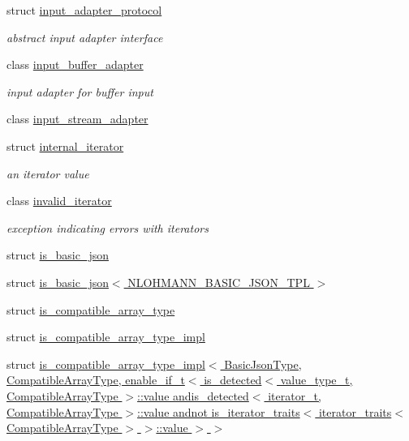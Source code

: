 \begin{DoxyCompactItemize}
struct \hyperlink{structnlohmann_1_1detail_1_1input__adapter__protocol}{input\+\_\+adapter\+\_\+protocol}
\begin{DoxyCompactList}\small\item\em abstract input adapter interface \end{DoxyCompactList}\item 
class \hyperlink{classnlohmann_1_1detail_1_1input__buffer__adapter}{input\+\_\+buffer\+\_\+adapter}
\begin{DoxyCompactList}\small\item\em input adapter for buffer input \end{DoxyCompactList}\item 
class \hyperlink{classnlohmann_1_1detail_1_1input__stream__adapter}{input\+\_\+stream\+\_\+adapter}
\item 
struct \hyperlink{structnlohmann_1_1detail_1_1internal__iterator}{internal\+\_\+iterator}
\begin{DoxyCompactList}\small\item\em an iterator value \end{DoxyCompactList}\item 
class \hyperlink{classnlohmann_1_1detail_1_1invalid__iterator}{invalid\+\_\+iterator}
\begin{DoxyCompactList}\small\item\em exception indicating errors with iterators \end{DoxyCompactList}\item 
struct \hyperlink{structnlohmann_1_1detail_1_1is__basic__json}{is\+\_\+basic\+\_\+json}
\item 
struct \hyperlink{structnlohmann_1_1detail_1_1is__basic__json_3_01_n_l_o_h_m_a_n_n___b_a_s_i_c___j_s_o_n___t_p_l_01_4}{is\+\_\+basic\+\_\+json$<$ N\+L\+O\+H\+M\+A\+N\+N\+\_\+\+B\+A\+S\+I\+C\+\_\+\+J\+S\+O\+N\+\_\+\+T\+P\+L $>$}
\item 
struct \hyperlink{structnlohmann_1_1detail_1_1is__compatible__array__type}{is\+\_\+compatible\+\_\+array\+\_\+type}
\item 
struct \hyperlink{structnlohmann_1_1detail_1_1is__compatible__array__type__impl}{is\+\_\+compatible\+\_\+array\+\_\+type\+\_\+impl}
\item 
struct \hyperlink{structnlohmann_1_1detail_1_1is__compatible__array__type__impl_3_01_basic_json_type_00_01_compatia6522f047ce0d0bd05b38ab6101e8786}{is\+\_\+compatible\+\_\+array\+\_\+type\+\_\+impl$<$ Basic\+Json\+Type, Compatible\+Array\+Type, enable\+\_\+if\+\_\+t$<$ is\+\_\+detected$<$ value\+\_\+type\+\_\+t, Compatible\+Array\+Type $>$\+::value andis\+\_\+detected$<$ iterator\+\_\+t, Compatible\+Array\+Type $>$\+::value andnot is\+\_\+iterator\+\_\+traits$<$ iterator\+\_\+traits$<$ Compatible\+Array\+Type $>$ $>$\+::value $>$ $>$}

\end{DoxyCompactItemize}
